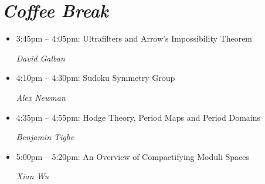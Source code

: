 \documentclass[oneside]{amsart}
\begin{document}
\section*{\textit{Coffee Break}}
\vspace{0.5em}
\begin{itemize}
\setlength\itemsep{1em}

\item 3:45pm -- 4:05pm: Ultrafilters and Arrow's Impossibility Theorem \\ \vspace{-1.5em} \begin{flushright}\textit{ David Galban }\end{flushright}
\item 4:10pm -- 4:30pm: Sudoku Symmetry Group \\ \vspace{-1.5em} \begin{flushright}\textit{ Alex Newman }\end{flushright}
\item 4:35pm -- 4:55pm: Hodge Theory, Period Maps and Period Domains \\ \vspace{-1.5em} \begin{flushright}\textit{ Benjamin Tighe }\end{flushright}
\item 5:00pm -- 5:20pm: An Overview of Compactifying Moduli Spaces \\ \vspace{-1.5em} \begin{flushright}\textit{ Xian Wu }\end{flushright}

\end{itemize}
\end{document}
